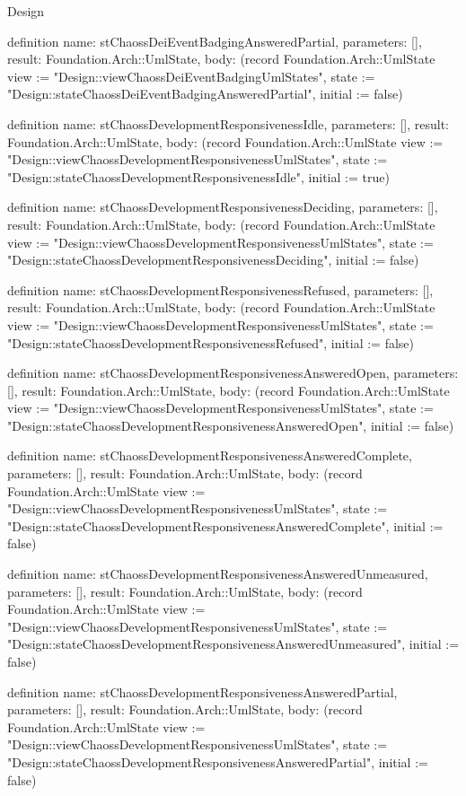 \begin{lexlean}{Design}
\begin{semanticmodule}
definition{
  name: stChaossDeiEventBadgingAnsweredPartial,
  parameters: [],
  result: Foundation.Arch::UmlState,
  body: (record Foundation.Arch::UmlState {view := "Design::viewChaossDeiEventBadgingUmlStates", state := "Design::stateChaossDeiEventBadgingAnsweredPartial", initial := false})
}

definition{
  name: stChaossDevelopmentResponsivenessIdle,
  parameters: [],
  result: Foundation.Arch::UmlState,
  body: (record Foundation.Arch::UmlState {view := "Design::viewChaossDevelopmentResponsivenessUmlStates", state := "Design::stateChaossDevelopmentResponsivenessIdle", initial := true})
}

definition{
  name: stChaossDevelopmentResponsivenessDeciding,
  parameters: [],
  result: Foundation.Arch::UmlState,
  body: (record Foundation.Arch::UmlState {view := "Design::viewChaossDevelopmentResponsivenessUmlStates", state := "Design::stateChaossDevelopmentResponsivenessDeciding", initial := false})
}

definition{
  name: stChaossDevelopmentResponsivenessRefused,
  parameters: [],
  result: Foundation.Arch::UmlState,
  body: (record Foundation.Arch::UmlState {view := "Design::viewChaossDevelopmentResponsivenessUmlStates", state := "Design::stateChaossDevelopmentResponsivenessRefused", initial := false})
}

definition{
  name: stChaossDevelopmentResponsivenessAnsweredOpen,
  parameters: [],
  result: Foundation.Arch::UmlState,
  body: (record Foundation.Arch::UmlState {view := "Design::viewChaossDevelopmentResponsivenessUmlStates", state := "Design::stateChaossDevelopmentResponsivenessAnsweredOpen", initial := false})
}

definition{
  name: stChaossDevelopmentResponsivenessAnsweredComplete,
  parameters: [],
  result: Foundation.Arch::UmlState,
  body: (record Foundation.Arch::UmlState {view := "Design::viewChaossDevelopmentResponsivenessUmlStates", state := "Design::stateChaossDevelopmentResponsivenessAnsweredComplete", initial := false})
}

definition{
  name: stChaossDevelopmentResponsivenessAnsweredUnmeasured,
  parameters: [],
  result: Foundation.Arch::UmlState,
  body: (record Foundation.Arch::UmlState {view := "Design::viewChaossDevelopmentResponsivenessUmlStates", state := "Design::stateChaossDevelopmentResponsivenessAnsweredUnmeasured", initial := false})
}

definition{
  name: stChaossDevelopmentResponsivenessAnsweredPartial,
  parameters: [],
  result: Foundation.Arch::UmlState,
  body: (record Foundation.Arch::UmlState {view := "Design::viewChaossDevelopmentResponsivenessUmlStates", state := "Design::stateChaossDevelopmentResponsivenessAnsweredPartial", initial := false})
}


\end{semanticmodule}
\end{lexlean}
